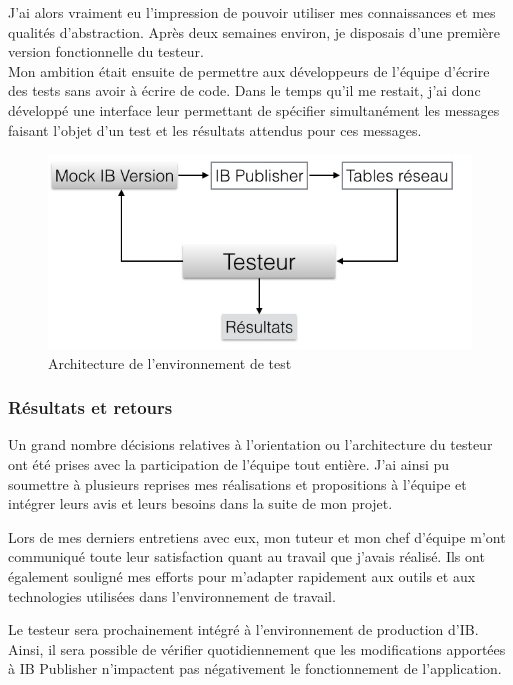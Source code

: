 \documentclass[11pt, oneside, titlepage, a4paper]{article}
\begin{document}
J'ai alors vraiment eu l'impression de pouvoir utiliser mes connaissances et mes qualités d'abstraction. Après deux semaines environ, je disposais d'une première version fonctionnelle du testeur.
\\

Mon ambition était ensuite de permettre aux développeurs de l'équipe d'écrire des tests sans avoir à écrire de code. Dans le temps qu'il me restait, j'ai donc développé une interface leur permettant de spécifier simultanément les messages faisant l'objet d'un test et les résultats attendus pour ces messages.
\begin{figure}
\begin{center}
\includegraphics[scale=0.5]{testeur.jpg}
\caption{Architecture de l'environnement de test}
\end{center}
\end{figure}
		\subsubsection{Résultats et retours}
Un grand nombre décisions relatives à l'orientation ou l'architecture du testeur ont été prises avec la participation de l'équipe tout entière. J'ai ainsi pu soumettre à plusieurs reprises mes réalisations et propositions à l'équipe et intégrer leurs avis et leurs besoins dans la suite de mon projet.

Lors de mes derniers entretiens avec eux, mon tuteur et mon chef d'équipe m'ont communiqué toute leur satisfaction quant au travail que j'avais réalisé. Ils ont également souligné mes efforts pour m'adapter rapidement aux outils et aux technologies utilisées dans l'environnement de travail.

Le testeur sera prochainement intégré à l'environnement de production d'IB. Ainsi, il sera possible de vérifier quotidiennement que les modifications apportées à IB Publisher n'impactent pas négativement le fonctionnement de l'application.
\\
\end{document}
